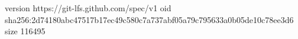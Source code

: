 version https://git-lfs.github.com/spec/v1
oid sha256:2d74180abc47517b17ec49c580c7a737abf05a79c795633a0b05de10c78ee3d6
size 116495
